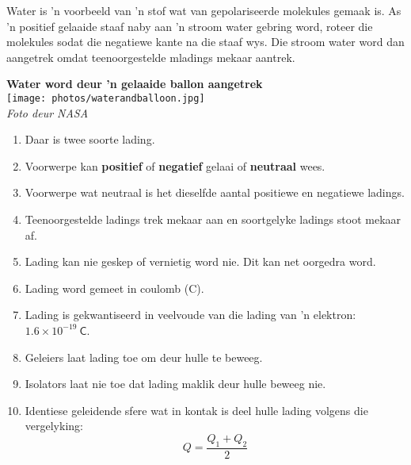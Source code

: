 \begin{minipage}{.5\textwidth}
Water is 'n voorbeeld van 'n stof wat van gepolariseerde molekules gemaak is. As 'n positief gelaaide staaf naby aan 'n stroom water gebring word, roteer die molekules sodat die negatiewe kante na die staaf wys. Die stroom water word dan aangetrek omdat teenoorgestelde mladings mekaar aantrek.      
\end{minipage}
\begin{minipage}{.5\textwidth}
\begin{center}
\textbf{Water word deur 'n gelaaide ballon aangetrek}\\

 \texttt{[image: photos/waterandballoon.jpg]}\\
\textsl{Foto deur NASA}
\end{center}
\end{minipage}
           

\begin{enumerate}[noitemsep, label=\textbf{\arabic*}. ] 
\item Daar is twee soorte lading.
\item Voorwerpe kan \textbf{positief} of \textbf{negatief} gelaai of \textbf{neutraal} wees.
\item Voorwerpe wat neutraal is het dieselfde aantal positiewe en negatiewe ladings.
\item Teenoorgestelde ladings trek mekaar aan en soortgelyke ladings stoot mekaar af.
\item Lading kan nie geskep of vernietig word nie. Dit kan net oorgedra word.
\item Lading word gemeet in coulomb (C).
\item Lading is gekwantiseerd in veelvoude van die lading van 'n elektron: $1.6\times10^{-19}~\mathsf{C}$.
\item Geleiers laat lading toe om deur hulle te beweeg. 
\item Isolators laat nie toe dat lading maklik deur hulle beweeg nie.
\item Identiese geleidende sfere wat in kontak is deel hulle lading volgens die vergelyking:
\begin{equation*}
 Q=\frac{Q_1+Q_2}{2}
\end{equation*}
\end{enumerate}
        
